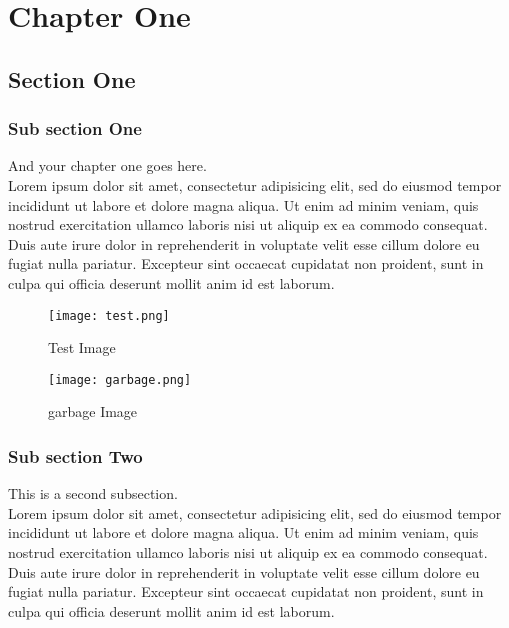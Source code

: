 \chapter{Chapter One}%
\label{chap:chapter_one}

\section{Section One}
\label{chap:section_one}

  \subsection{Sub section One}

  And your chapter one goes here\cite{web001}\@. ~\\
  Lorem ipsum dolor sit amet, consectetur adipisicing elit, sed do eiusmod
  tempor incididunt ut labore et dolore magna aliqua. Ut enim ad minim veniam,
  quis nostrud exercitation ullamco laboris nisi ut aliquip ex ea commodo
  consequat. Duis aute irure dolor in reprehenderit in voluptate velit esse
  cillum dolore eu fugiat nulla pariatur. Excepteur sint occaecat cupidatat non
  proident, sunt in culpa qui officia deserunt mollit anim id est laborum.

  \begin{figure}[H]%
    \center%
    \texttt{[image: test.png]}%
    \caption[This is a test image]{Test Image}\label{fig:test}%
  \end{figure}
  
   \begin{figure}[H]%
    \center%
    \texttt{[image: garbage.png]}%
    \caption[This is a test image]{garbage Image}\label{fig:test}%
  \end{figure}

  \subsection{Sub section Two}

  This is a second subsection\cite{bazerman1988shaping}. ~\\
  Lorem ipsum dolor sit amet, consectetur adipisicing elit, sed do eiusmod
  tempor incididunt ut labore et dolore magna aliqua. Ut enim ad minim veniam,
  quis nostrud exercitation ullamco laboris nisi ut aliquip ex ea commodo
  consequat. Duis aute irure dolor in reprehenderit in voluptate velit esse
  cillum dolore eu fugiat nulla pariatur. Excepteur sint occaecat cupidatat non
  proident, sunt in culpa qui officia deserunt mollit anim id est laborum.

